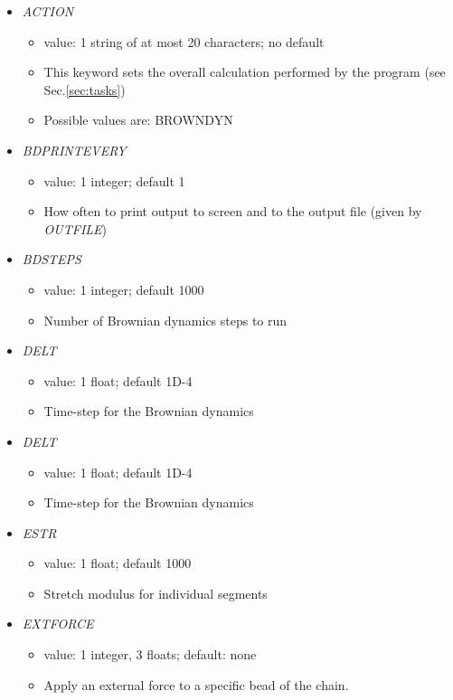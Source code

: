 \documentclass[12pt]{article}
\begin{document}
\begin{itemize}
%
\item {\it ACTION}
  \begin{itemize}
    \item  value: 1 string of at most 20 characters; no default
    \item This keyword sets the overall calculation performed by the program (see Sec.\ref{sec:tasks})
    \item Possible values are: BROWNDYN
  \end{itemize}
%
\item {\it BDPRINTEVERY}
  \begin{itemize}
    \item  value: 1 integer; default 1
    \item How often to print output to screen and to the output file (given by {\em OUTFILE})
  \end{itemize}
%
\item {\it BDSTEPS}
    \begin{itemize}
      \item  value: 1 integer; default 1000
      \item Number of Brownian dynamics steps to run
    \end{itemize}
%
\item {\it DELT}
    \begin{itemize}
      \item  value: 1 float; default 1D-4
      \item Time-step for the Brownian dynamics
    \end{itemize}
%
\item {\it DELT}
    \begin{itemize}
      \item  value: 1 float; default 1D-4
      \item Time-step for the Brownian dynamics
    \end{itemize}
%    
\item {\it ESTR}
    \begin{itemize}
      \item  value: 1 float; default 1000
      \item Stretch modulus for individual segments
    \end{itemize}
%    
\item {\it EXTFORCE}
    \begin{itemize}
      \item  value: 1 integer, 3 floats; default: none
      \item Apply an external force to a specific bead of the chain. 

\end{itemize}
\end{itemize}
\end{document}
